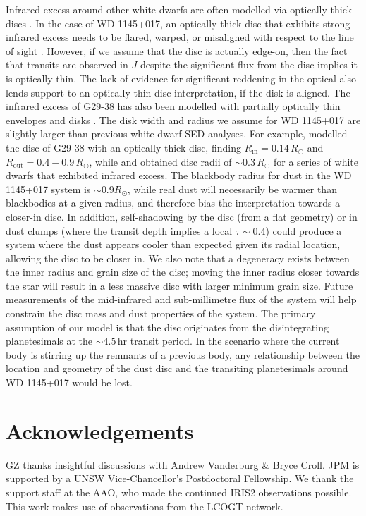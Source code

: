 \documentclass[useAMS,usenatbib]{mn2e}
\begin{document}
Infrared excess around other white dwarfs are often modelled via optically thick discs \citep[e.g.][]{2003ApJ...584L..91J,2009ApJ...694..805F}. In the case of WD 1145+017, an optically thick disc that exhibits strong infrared excess needs to be flared, warped, or misaligned with respect to the line of sight \citep{2015Natur.526..546V,2016ApJ...816L..22X}. However, if we assume that the disc is actually edge-on, then the fact that transits are observed in $J$ despite the significant flux from the disc implies it is optically thin. The lack of evidence for significant reddening in the optical also lends support to an optically thin disc interpretation, if the disk is aligned. The infrared excess of G29-38 has also been modelled with partially optically thin envelopes and disks \citep[e.g. G29-38,][]{2005ApJ...635L.161R,2009ApJ...693..697R}. The disk width and radius we assume for WD 1145+017 are slightly larger than previous white dwarf SED analyses. For example, \citet{2003ApJ...584L..91J} modelled the disc of G29-38 with an optically thick disc, finding $R_\mathrm{in} = 0.14\,R_\odot$ and $R_\mathrm{out} = 0.4-0.9\,R_\odot$, while \citet{2009ApJ...694..805F} and \citet{2014ApJ...786...77B} obtained disc radii of $\sim 0.3\,R_\odot$ for a series of white dwarfs that exhibited infrared excess. The blackbody radius for dust in the WD 1145+017 system is $\sim 0.9 R_\odot$, while real dust will necessarily be warmer than blackbodies at a given radius, and therefore bias the interpretation towards a closer-in disc. In addition, self-shadowing by the disc (from a flat geometry) or in dust clumps (where the transit depth implies a local $\tau \sim 0.4$) could produce a system where the dust appears cooler than expected given its radial location, allowing the disc to be closer in. We also note that a degeneracy exists between the inner radius and grain size of the disc; moving the inner radius closer towards the star will result in a less massive disc with larger minimum grain size. Future measurements of the mid-infrared and sub-millimetre flux of the system will help constrain the disc mass and dust properties of the system. The primary assumption of our model is that the disc originates from the disintegrating planetesimals at the $\sim 4.5$\,hr transit period. In the scenario where the current body is stirring up the remnants of a previous body, any relationship between the location and geometry of the dust disc and the transiting planetesimals around WD 1145+017 would be lost.



\section*{Acknowledgements}
\label{sec:acknowledgements}
GZ thanks insightful discussions with Andrew Vanderburg \& Bryce Croll. JPM is supported by a UNSW Vice-Chancellor's Postdoctoral Fellowship. We thank the support staff at the AAO, who made the continued IRIS2 observations possible. This work makes use of observations from the LCOGT network.





\label{lastpage}
\end{document}
